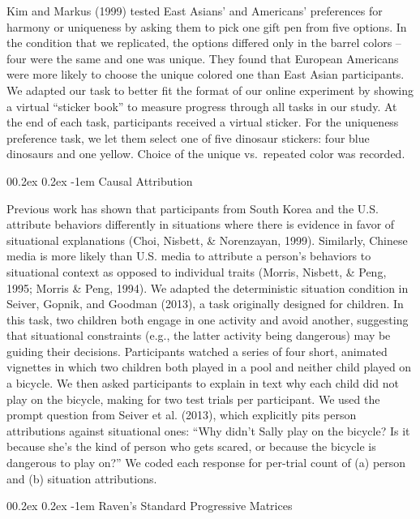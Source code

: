 \documentclass[
  man,floatsintext]{apa6}
\makeatletter
\let\oldparagraph\paragraph
\renewcommand{\paragraph}[1]{\oldparagraph{#1}\mbox{}}
\renewcommand{\paragraph}{\@startsection{paragraph}{4}{\parindent}%
  {0\baselineskip \@plus 0.2ex \@minus 0.2ex}%
  {-1em}%
  {\normalfont\normalsize\bfseries\itshape\typesectitle}}
\makeatother
\begin{document}
Kim and Markus (1999) tested East Asians' and Americans' preferences for harmony or uniqueness by asking them to pick one gift pen from five options. In the condition that we replicated, the options differed only in the barrel colors -- four were the same and one was unique. They found that European Americans were more likely to choose the unique colored one than East Asian participants. We adapted our task to better fit the format of our online experiment by showing a virtual ``sticker book'' to measure progress through all tasks in our study. At the end of each task, participants received a virtual sticker. For the uniqueness preference task, we let them select one of five dinosaur stickers: four blue dinosaurs and one yellow. Choice of the unique vs.~repeated color was recorded.

\hypertarget{causal-attribution}{%
\paragraph{Causal Attribution}\label{causal-attribution}}

Previous work has shown that participants from South Korea and the U.S. attribute behaviors differently in situations where there is evidence in favor of situational explanations (Choi, Nisbett, \& Norenzayan, 1999). Similarly, Chinese media is more likely than U.S. media to attribute a person's behaviors to situational context as opposed to individual traits (Morris, Nisbett, \& Peng, 1995; Morris \& Peng, 1994). We adapted the deterministic situation condition in Seiver, Gopnik, and Goodman (2013), a task originally designed for children. In this task, two children both engage in one activity and avoid another, suggesting that situational constraints (e.g., the latter activity being dangerous) may be guiding their decisions. Participants watched a series of four short, animated vignettes in which two children both played in a pool and neither child played on a bicycle. We then asked participants to explain in text why each child did not play on the bicycle, making for two test trials per participant. We used the prompt question from Seiver et al. (2013), which explicitly pits person attributions against situational ones: ``Why didn't Sally play on the bicycle? Is it because she's the kind of person who gets scared, or because the bicycle is dangerous to play on?'' We coded each response for per-trial count of (a) person and (b) situation attributions.

\hypertarget{ravens-standard-progressive-matrices}{%
\paragraph{Raven's Standard Progressive Matrices}\label{ravens-standard-progressive-matrices}}
\end{document}
